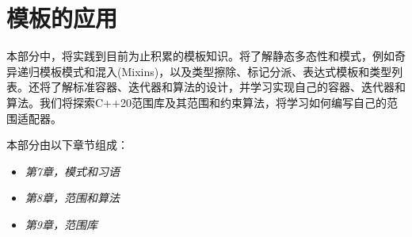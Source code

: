 \part{模板的应用}
本部分中，将实践到目前为止积累的模板知识。将了解静态多态性和模式，例如奇异递归模板模式和混入(Mixins)，以及类型擦除、标记分派、表达式模板和类型列表。还将了解标准容器、迭代器和算法的设计，并学习实现自己的容器、迭代器和算法。我们将探索C++20范围库及其范围和约束算法，将学习如何编写自己的范围适配器。

本部分由以下章节组成：

\begin{itemize}
  \item \textit{第7章，模式和习语}
  \item \textit{第8章，范围和算法}
  \item \textit{第9章，范围库}
\end{itemize}



